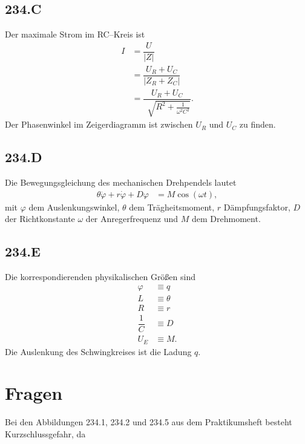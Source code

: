 \documentclass[a4paper,12pt]{article}
\numberwithin{equation}{section}
\begin{document}
\subsection{234.C}
Der maximale Strom im RC--Kreis ist
\begin{align} 
        I&=\dfrac{U}{|Z|}\\
         &=\dfrac{U_R+U_C}{|Z_R+Z_C|}\\
         &=\dfrac{U_R+U_C}{\,\sqrt[]{R^2+\tfrac{1}{\omega^2 C^2} }}
.\end{align} 
Der Phasenwinkel im Zeigerdiagramm ist zwischen $U_R$ und $U_C$ zu finden.

\subsection{234.D}
Die Bewegungsgleichung des mechanischen Drehpendels lautet
\begin{align} 
        \theta \ddot{\varphi }+r\dot{\varphi }+D\varphi &=M\cos \left(\omega t\right)
,\end{align} 
mit $\varphi $ dem Auslenkungswinkel, $\theta $ dem Trägheitsmoment, $r$ Dämpfungsfaktor, $D$ der Richtkonstante $\omega $ der Anregerfrequenz und $M$ dem Drehmoment.

\subsection{234.E}
Die korrespondierenden physikalischen Größen sind
\begin{align} 
        \varphi &\equiv q\\
        L&\equiv \theta \\
        R&\equiv r\\
        \dfrac{1}{C}&\equiv D\\
        U_E&\equiv M
.\end{align} 
Die Auslenkung des Schwingkreises ist die Ladung $q$.

\newpage
\section{Fragen}
Bei den Abbildungen 234.1, 234.2 und 234.5 aus dem Praktikumsheft besteht Kurzschlussgefahr, da 

\end{document}
